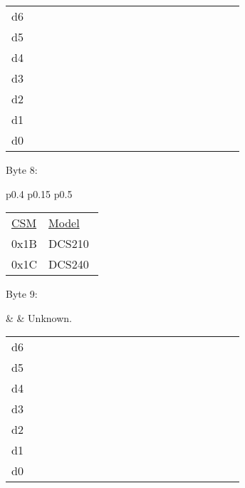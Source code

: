 \begin{tabular}{p{0.05\linewidth} p{0.6\linewidth}} 
d6 & \\
d5 & \\
d4 & \\
d3 & \\
d2 & \\
d1 & \\
d0 & \\
\end{tabular}

Byte 8:

\begin{tabular}{p{0.4\linewidth} p{0.15\linewidth} p{0.5\linewidth}} 

\begin{tabular}{|p{0.3cm}|p{0.3cm}|p{0.3cm}|p{0.3cm}|p{0.3cm}|p{0.3cm}|p{0.3cm}|p{0.3cm}|}
\hline
0 & n & n & n & n & n & n & n\\
\hline
\end{tabular}
& $<$CSM$>$ & Command station model.\\
\end{tabular}

\begin{tabular}{p{0.1\linewidth} p{0.6\linewidth}} 
\underline{CSM} & \underline{Model}\\
0x1B & DCS210\\
0x1C & DCS240\\
\end{tabular}

Byte 9:

&  & Unknown.\\
\end{tabular}

\begin{tabular}{p{0.05\linewidth} p{0.6\linewidth}} 
d6 & \\
d5 & \\
d4 & \\
d3 & \\
d2 & \\
d1 & \\
d0 & \\
\end{tabular}

